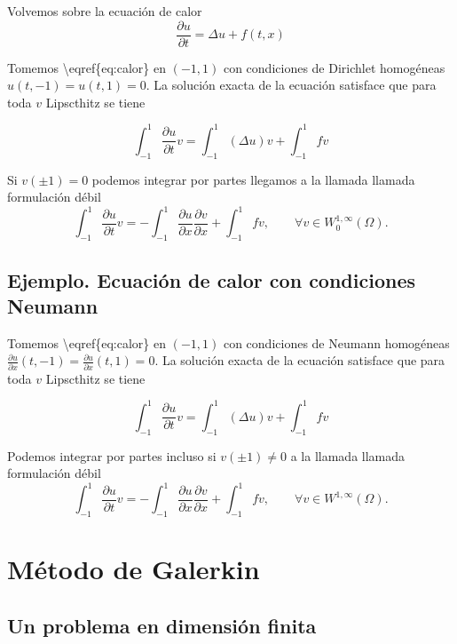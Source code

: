 Volvemos sobre la ecuación de calor \[
    \tag{C}
    \label{eq:calor}
    \frac{\partial u}{\partial t} = \Delta u + f(t,x)
\]

Tomemos \textbackslash eqref\{eq:calor\} en \((-1,1)\) con condiciones
de Dirichlet homogéneas \(u(t,-1) = u(t,1) = 0\). La solución exacta de
la ecuación satisface que para toda \(v\) Lipscthitz se tiene

\[
    \int_{-1}^1 \frac{\partial u}{\partial t} v = \int_{-1}^1 (\Delta u) v + \int_{-1}^1 f v
\]



Si \(v(\pm 1) = 0\) podemos integrar por partes llegamos a la llamada
llamada formulación débil \[
    \int_{-1}^1 \frac{\partial u}{\partial t} v = - \int_{-1}^1 \frac{\partial u}{\partial x} \frac{\partial v}{\partial x} + \int_{-1}^1 f v , \qquad \forall v \in W_0^{1,\infty} (\Omega).
\]

\subsection{Ejemplo. Ecuación de calor con condiciones
    Neumann}\label{ejemplo-ecuaciuxf3n-de-calor-con-condiciones-neumann}

Tomemos \textbackslash eqref\{eq:calor\} en \((-1,1)\) con condiciones
de Neumann homogéneas
\(\frac{\partial u}{\partial x}(t,-1) = \frac{\partial u}{\partial x}(t,1) = 0\).
La solución exacta de la ecuación satisface que para toda \(v\)
Lipscthitz se tiene

\[
    \int_{-1}^1 \frac{\partial u}{\partial t} v = \int_{-1}^1 (\Delta u) v + \int_{-1}^1 f v
\]



Podemos integrar por partes incluso si \(v(\pm 1) \ne 0\) a la llamada
llamada formulación débil \[
    \int_{-1}^1 \frac{\partial u}{\partial t} v = - \int_{-1}^1 \frac{\partial u}{\partial x} \frac{\partial v}{\partial x} + \int_{-1}^1 f v , \qquad \forall v \in W^{1,\infty} (\Omega).
\]

\section{Método de Galerkin}\label{muxe9todo-de-galerkin}

\subsection{Un problema en dimensión
    finita}\label{un-problema-en-dimensiuxf3n-finita}

